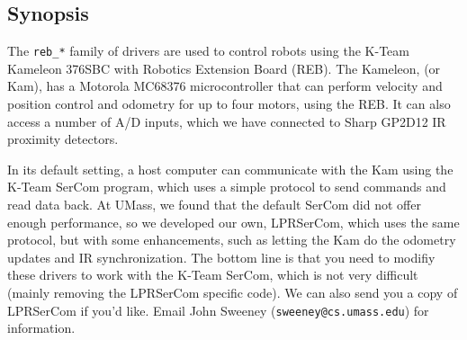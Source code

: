 \subsection*{Synopsis}
The {\tt reb\_*} family of drivers are used to control robots using
the K-Team Kameleon 376SBC with Robotics Extension Board (REB).  The Kameleon, (or Kam), has a Motorola MC68376 microcontroller that can perform velocity and position control and odometry for up to four motors, using the REB.  It can also access a number of A/D inputs, which we have connected to Sharp GP2D12 IR proximity detectors.  

In its default setting, a host computer can communicate with the Kam using the K-Team SerCom program, which uses a simple protocol to send commands and read data back.  At UMass, we found that the default SerCom did not offer enough performance, so we developed our own, LPRSerCom, which uses the same protocol, but with some enhancements, such as letting the Kam do the odometry updates and IR synchronization.  The bottom line is that you need to modifiy these drivers to work with the K-Team SerCom, which is not very difficult (mainly removing the LPRSerCom specific code).  We can also send you a copy of LPRSerCom if you'd like.  Email John Sweeney (\texttt{sweeney@cs.umass.edu}) for information.

